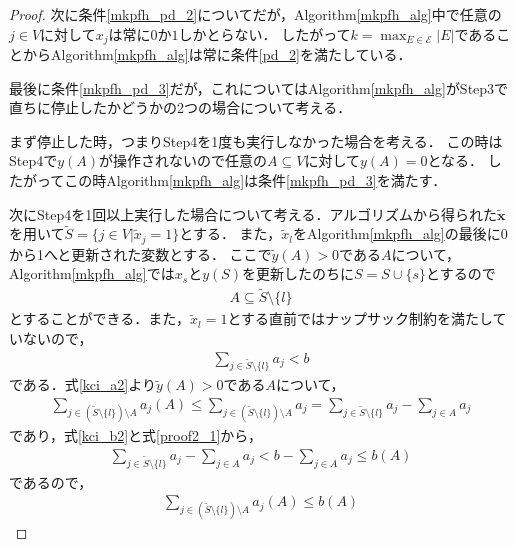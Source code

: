 \documentclass[11pt,dvipdfmx]{jarticle}
\numberwithin{equation}{section}
\newtheorem{proof}{証明}
\begin{document}
\begin{proof}
            次に条件\eqref{mkpfh_pd_2}についてだが，Algorithm\ref{mkpfh_alg}中で任意の$j\in V$に対して$x_j$は常に$0$か$1$しかとらない．
            したがって$k=\displaystyle\max_{E\in \mathcal{E}}|E|$であることからAlgorithm\ref{mkpfh_alg}は常に条件\eqref{pd_2}を満たしている．\par
            最後に条件\eqref{mkpfh_pd_3}だが，これについてはAlgorithm\ref{mkpfh_alg}がStep3で直ちに停止したかどうかの2つの場合について考える．\par
            まず停止した時，つまりStep4を1度も実行しなかった場合を考える．
            この時はStep4で$y(A)$が操作されないので任意の$A\subseteq V$に対して$y(A)=0$となる．
            したがってこの時Algorithm\ref{mkpfh_alg}は条件\eqref{mkpfh_pd_3}を満たす．\par
            次にStep4を1回以上実行した場合について考える．アルゴリズムから得られた$\tilde{\bm{x}}$を用いて$\tilde{S}=\{j\in V|\tilde{x}_j=1\}$とする．
            また，$\tilde{x}_l$をAlgorithm\ref{mkpfh_alg}の最後に0から1へと更新された変数とする．
            ここで$\tilde{y}(A)>0$である$A$について，Algorithm\ref{mkpfh_alg}では$x_s$と$y(S)$を更新したのちに$S=S\cup \{s\}$とするので
            \begin{align}
                A\subseteq \tilde{S}\setminus\{l\}
            \end{align}
            とすることができる．また，$\tilde{x}_l=1$とする直前ではナップサック制約を満たしていないので，
            \begin{align}
                \sum_{j\in\tilde{S}\setminus\{l\}}{a_j}<b
            \label{proof2_1}
            \end{align}
            である．式\eqref{kci_a2}より$\tilde{y}(A)>0$である$A$について，
            \begin{align}
                \sum_{j\in (\tilde{S}\setminus\{l\})\setminus A}{a_j(A)}\le\sum_{j\in (\tilde{S}\setminus\{l\})\setminus A}{a_j}=\sum_{j \in\tilde{S}\setminus\{l\}}{a_j}-\sum_{j\in A}{a_j}
            \end{align}
            であり，式\eqref{kci_b2}と式\eqref{proof2_1}から，
            \begin{align}
                \sum_{j \in\tilde{S}\setminus\{l\}}{a_j}-\sum_{j\in A}{a_j}<b-\sum_{j\in A}{a_j}\le b(A)
            \end{align}
            であるので，
            \begin{align}
                \sum_{j\in (\tilde{S}\setminus\{l\})\setminus A}{a_j(A)}\le b(A)
            \end{align}

\end{proof}
\end{document}
